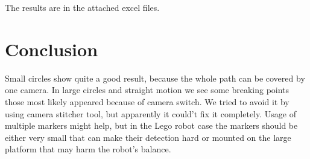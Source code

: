 \documentclass[a4paper, 12pt]{article}
\begin{document}
The results are in the attached excel files.

\section{Conclusion}

Small circles show quite a good result, because the whole path can be covered by one camera. In large circles and straight motion we see some breaking points those most likely appeared because of camera switch. We tried to avoid it by using camera stitcher tool, but apparently it could't fix it completely. Usage of multiple markers might help, but in the Lego robot case the markers should be either very small that can make their detection hard or mounted on the large platform that may harm the robot's balance. 
\end{document}
